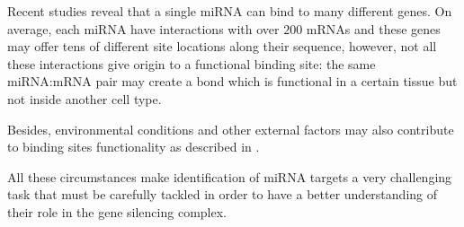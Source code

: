 Recent studies \cite{common_features} \cite{computational_methods} reveal that a single miRNA can bind to many different genes. On average, each miRNA have interactions with over $200$ mRNAs and these genes may offer tens of  different site locations along their sequence, however, not all these interactions give origin to a functional binding site: the same miRNA:mRNA pair may create a bond which is functional in a certain tissue but not inside another cell type. 

Besides, environmental conditions and other external factors  may also contribute to binding sites functionality as described in \cite{efficient_use_accessibility}.

All these circumstances make identification of miRNA targets a very challenging task that must be carefully tackled in order to have a better understanding of their role in the gene silencing complex. 
